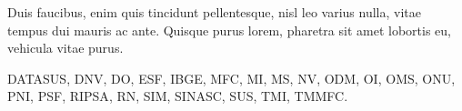 Duis faucibus, enim quis tincidunt pellentesque, nisl leo varius nulla, vitae tempus dui mauris ac ante. Quisque purus lorem, pharetra sit amet lobortis eu, vehicula vitae purus.

\acrlong{DATASUS}, \acrlong{DNV}, \acrlong{DO}, \acrlong{ESF}, \acrlong{IBGE}, \acrlong{MFC}, \acrlong{MI}, \acrlong{MS}, \acrlong{NV}, \acrlong{ODM}, \acrlong{OI}, \acrlong{OMS}, \acrlong{ONU}, \acrlong{PNI}, \acrlong{PSF}, \acrlong{RIPSA}, \acrlong{RN}, \acrlong{SIM}, \acrlong{SINASC}, \acrlong{SUS}, \acrlong{TMI}, \acrlong{TMMFC}.
